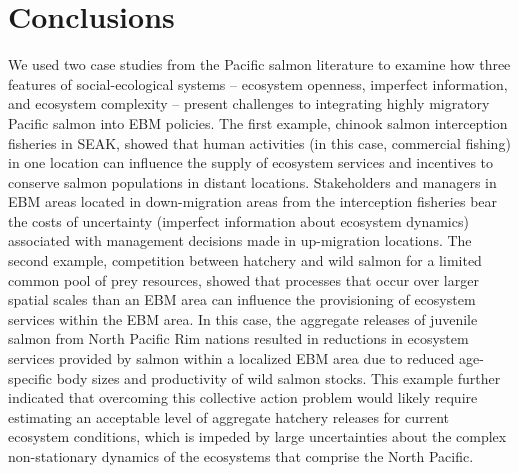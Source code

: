 \section{Conclusions}

We used two case studies from the Pacific salmon literature to examine
how three features of social-ecological systems -- ecosystem openness,
imperfect information, and ecosystem complexity -- present challenges to
integrating highly migratory Pacific salmon into EBM policies. The first
example, chinook salmon interception fisheries in SEAK, showed that
human activities (in this case, commercial fishing) in one location can
influence the supply of ecosystem services and incentives to conserve
salmon populations in distant locations. Stakeholders and managers in
EBM areas located in down-migration areas from the interception
fisheries bear the costs of uncertainty (imperfect information about
ecosystem dynamics) associated with management decisions made in
up-migration locations. The second example, competition between hatchery
and wild salmon for a limited common pool of prey resources, showed that
processes that occur over larger spatial scales than an EBM area can
influence the provisioning of ecosystem services within the EBM area. In
this case, the aggregate releases of juvenile salmon from North Pacific
Rim nations resulted in reductions in ecosystem services provided by
salmon within a localized EBM area due to reduced age-specific body
sizes and productivity of wild salmon stocks. This example further
indicated that overcoming this collective action problem would likely
require estimating an acceptable level of aggregate hatchery releases
for current ecosystem conditions, which is impeded by large
uncertainties about the complex non-stationary dynamics of the
ecosystems that comprise the North Pacific.


